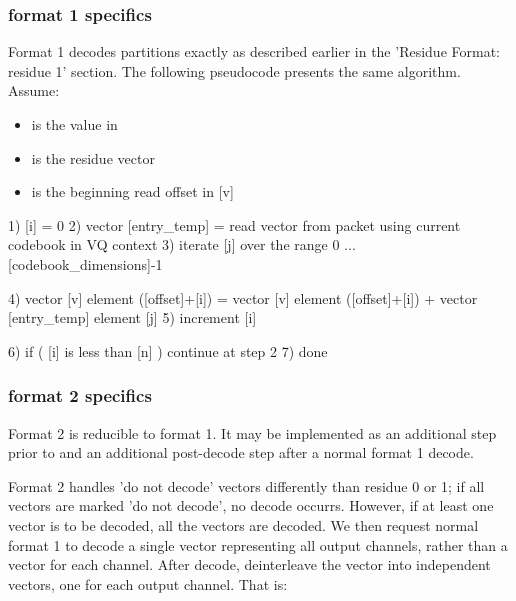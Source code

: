 \subsubsection{format 1 specifics}

Format 1 decodes partitions exactly as described earlier in the
'Residue Format: residue 1' section.  The following pseudocode
presents the same algorithm. Assume:

\begin{itemize}
\item  \varname{[n]} is the value in
\item \varname{[v]} is the residue vector
\item \varname{[offset]} is the beginning read offset in [v]
\end{itemize}


\begin{programlisting}
 1) [i] = 0
 2) vector [entry_temp] = read vector from packet using current codebook in VQ context
 3) iterate [j] over the range 0 ... [codebook_dimensions]-1 {

      4) vector [v] element ([offset]+[i]) =
	  vector [v] element ([offset]+[i]) +
          vector [entry_temp] element [j]
      5) increment [i]

    }

  6) if ( [i] is less than [n] ) continue at step 2
  7) done
\end{programlisting}



\subsubsection{format 2 specifics}

Format 2 is reducible to format 1.  It may be implemented as an additional step prior to and an additional post-decode step after a normal format 1 decode.


Format 2 handles 'do not decode' vectors differently than residue 0 or
1; if all vectors are marked 'do not decode', no decode occurrs.
However, if at least one vector is to be decoded, all the vectors are
decoded.  We then request normal format 1 to decode a single vector
representing all output channels, rather than a vector for each
channel.  After decode, deinterleave the vector into independent vectors, one for each output channel.  That is:

